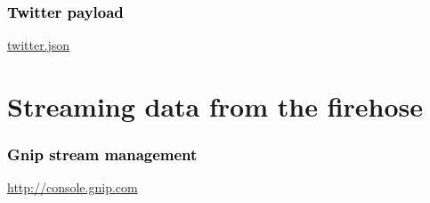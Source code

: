 \documentclass{beamer}
\begin{document}
{
\begin{frame}\frametitle{\textcolor{black} {Twitter payload}}
  \begin{center}
\textcolor{black} {
\Huge \href{run:./twitter_record.html}{twitter.json} }
  \end{center}
\end{frame}
}

\section{Streaming data from the firehose}

{
\begin{frame}\frametitle{\textcolor{black} {Gnip stream management}}
  \begin{center}
\textcolor{black} {
\Huge \href{http://console.gnip.com}{http://console.gnip.com} 
}
  \end{center}
\end{frame}
}
\end{document}
